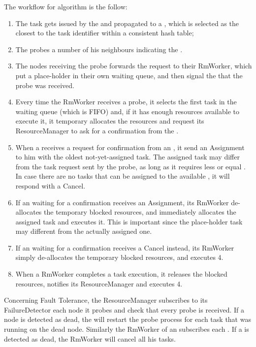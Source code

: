 \documentclass[conference]{IEEEtran}
\begin{document}
  The workflow for \us algorithm is the follow:
  \begin{enumerate}
  
  \item The task gets issued by the \dc and propagated
        to a \tmast, which is selected as the closest to the task
        identifier within a consistent hash table;

 \item The \tmast probes a number of his neighbours indicating the \treq.
 
 \item The nodes receiving the probe forwards the request to their RmWorker, which put a place-holder in their own waiting queue, and then signal the \tmast that the probe was received.
 
 \item Every time the RmWorker receives a probe, it selects the first task in the waiting queue (which is FIFO) and, if it has enough resources available to execute it, it temporary allocates the \treq resources and request its ResourceManager to ask for a confirmation from the \tmast.
 
 \item When a \tmast receives a request for confirmation from an \exc, it send an Assignment to him with the oldest not-yet-assigned task. The assigned task may differ from the task request sent by the probe, as long as it requires less or equal \treq. In case there are no tasks that can be assigned to the available \exc, it will respond with a Cancel.
 
 \item If an \exc waiting for a confirmation receives an Assignment, its RmWorker de-allocates the temporary blocked resources, and immediately allocates the assigned task and executes it. This is important since the place-holder task may different from the actually assigned one.

 \item If an \exc waiting for a confirmation receives a Cancel instead, its RmWorker simply de-allocates the temporary blocked resources, and executes 4.
 
 \item When a \exc RmWorker completes a task execution, it releases the blocked resources, notifies its ResourceManager and executes 4.
 
  \end{enumerate}
 
 Concerning Fault Tolerance, the ResourceManager subscribes to its FailureDetector each node it probes and check that every probe is received. If a node is detected as dead, the \tmast will restart the probe process for each task that was running on the dead node. Similarly the RmWorker of an \exc subscribes each \tmast. If a \tmast is detected as dead, the RmWorker will cancel all his tasks.
  
\end{document}
